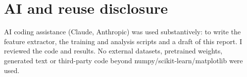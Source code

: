 \documentclass[10pt,a4paper]{article}
\begin{document}
\section{AI and reuse disclosure}
AI coding assistance (Claude, Anthropic) was used substantively: to write the feature extractor, the training and analysis scripts and a draft of this report. I reviewed the code and results. No external datasets, pretrained weights, generated text or third-party code beyond numpy/scikit-learn/matplotlib were used.
\end{document}
